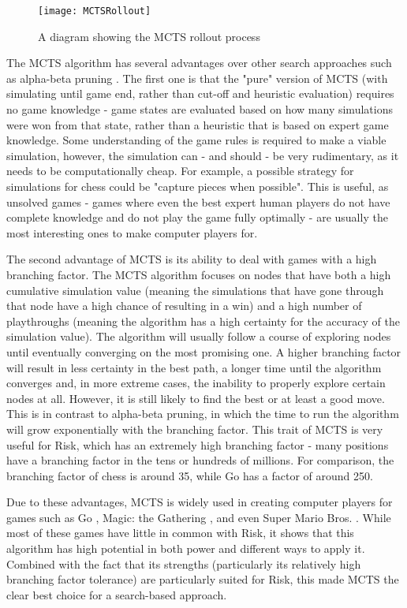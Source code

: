 \begin{figure}[H]
\texttt{[image: MCTSRollout]}
\caption{A diagram showing the MCTS rollout process}
\label{fig:MCTSRollout}
\end{figure}

The MCTS algorithm has several advantages over other search approaches such as alpha-beta pruning \cite{knuth1975analysis}. The first one is that the "pure" version of MCTS (with simulating until game end, rather than cut-off and heuristic evaluation) requires no game knowledge - game states are evaluated based on how many simulations were won from that state, rather than a heuristic that is based on expert game knowledge. Some understanding of the game rules is required to make a viable simulation, however, the simulation can - and should - be very rudimentary, as it needs to be computationally cheap. For example, a possible strategy for simulations for chess could be "capture pieces when possible". This is useful, as unsolved games - games where even the best expert human players do not have complete knowledge and do not play the game fully optimally - are usually the most interesting ones to make computer players for.

The second advantage of MCTS is its ability to deal with games with a high branching factor. The MCTS algorithm focuses on nodes that have both a high cumulative simulation value (meaning the simulations that have gone through that node have a high chance of resulting in a win) and a high number of playthroughs (meaning the algorithm has a high certainty for the accuracy of the simulation value). The algorithm will usually follow a course of exploring nodes until eventually converging on the most promising one. A higher branching factor will result in less certainty in the best path, a longer time until the algorithm converges and, in more extreme cases, the inability to properly explore certain nodes at all. However, it is still likely to find the best or at least a good move. This is in contrast to alpha-beta pruning, in which the time to run the algorithm will grow exponentially with the branching factor. This trait of MCTS is very useful for Risk, which has an extremely high branching factor \cite{bauer2023artificial} - many positions have a branching factor in the tens or hundreds of millions. For comparison, the branching factor of chess is around 35, while Go has a factor of around 250.

Due to these advantages, MCTS is widely used in creating computer players \cite{swiechowski2023monte} for games such as Go \cite{silver2016mastering,coulom2007computing}, Magic: the Gathering \cite{cowling2012ensemble}, and even Super Mario Bros. \cite{jacobsen2014monte}. While most of these games have little in common with Risk, it shows that this algorithm has high potential in both power and different ways to apply it. Combined with the fact that its strengths (particularly its relatively high branching factor tolerance) are particularly suited for Risk, this made MCTS the clear best choice for a search-based approach.

